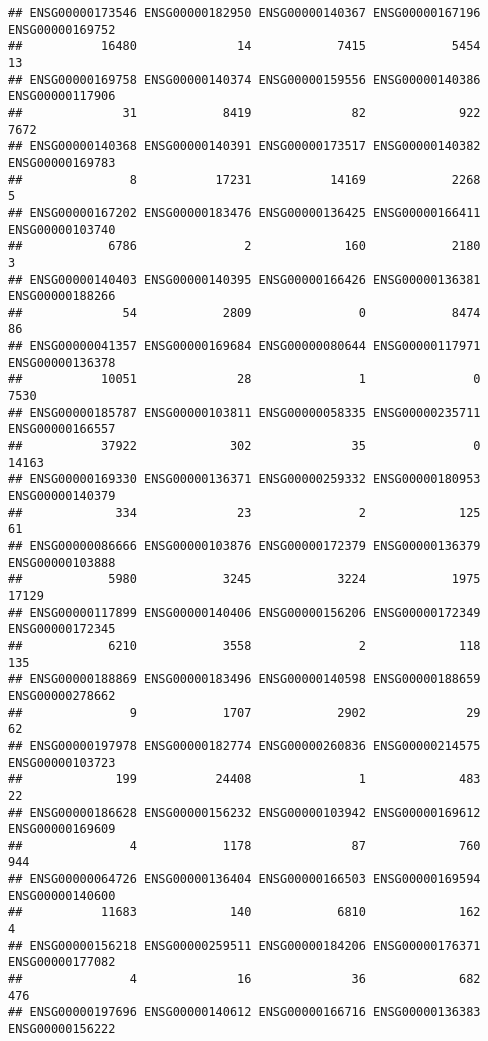 \documentclass[
]{article}
\begin{document}
\begin{verbatim}
## ENSG00000173546 ENSG00000182950 ENSG00000140367 ENSG00000167196 ENSG00000169752 
##           16480              14            7415            5454              13 
## ENSG00000169758 ENSG00000140374 ENSG00000159556 ENSG00000140386 ENSG00000117906 
##              31            8419              82             922            7672 
## ENSG00000140368 ENSG00000140391 ENSG00000173517 ENSG00000140382 ENSG00000169783 
##               8           17231           14169            2268               5 
## ENSG00000167202 ENSG00000183476 ENSG00000136425 ENSG00000166411 ENSG00000103740 
##            6786               2             160            2180               3 
## ENSG00000140403 ENSG00000140395 ENSG00000166426 ENSG00000136381 ENSG00000188266 
##              54            2809               0            8474              86 
## ENSG00000041357 ENSG00000169684 ENSG00000080644 ENSG00000117971 ENSG00000136378 
##           10051              28               1               0            7530 
## ENSG00000185787 ENSG00000103811 ENSG00000058335 ENSG00000235711 ENSG00000166557 
##           37922             302              35               0           14163 
## ENSG00000169330 ENSG00000136371 ENSG00000259332 ENSG00000180953 ENSG00000140379 
##             334              23               2             125              61 
## ENSG00000086666 ENSG00000103876 ENSG00000172379 ENSG00000136379 ENSG00000103888 
##            5980            3245            3224            1975           17129 
## ENSG00000117899 ENSG00000140406 ENSG00000156206 ENSG00000172349 ENSG00000172345 
##            6210            3558               2             118             135 
## ENSG00000188869 ENSG00000183496 ENSG00000140598 ENSG00000188659 ENSG00000278662 
##               9            1707            2902              29              62 
## ENSG00000197978 ENSG00000182774 ENSG00000260836 ENSG00000214575 ENSG00000103723 
##             199           24408               1             483              22 
## ENSG00000186628 ENSG00000156232 ENSG00000103942 ENSG00000169612 ENSG00000169609 
##               4            1178              87             760             944 
## ENSG00000064726 ENSG00000136404 ENSG00000166503 ENSG00000169594 ENSG00000140600 
##           11683             140            6810             162               4 
## ENSG00000156218 ENSG00000259511 ENSG00000184206 ENSG00000176371 ENSG00000177082 
##               4              16              36             682             476 
## ENSG00000197696 ENSG00000140612 ENSG00000166716 ENSG00000136383 ENSG00000156222 

\end{verbatim}
\end{document}
